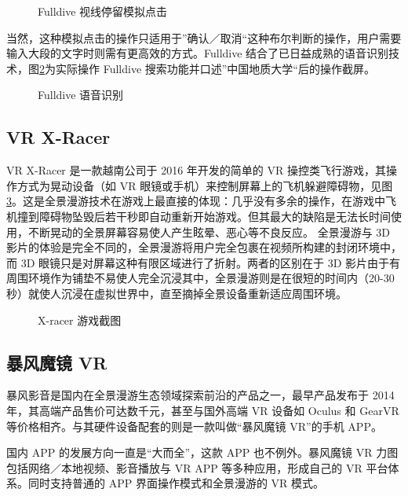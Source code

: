 \begin{figure}[htp]
\centering
{}
\caption{Fulldive 视线停留模拟点击}
\label{fig:fulldive3}
\end{figure}

当然，这种模拟点击的操作只适用于”确认／取消“这种布尔判断的操作，用户需要输入大段的文字时则需有更高效的方式。Fulldive 结合了已日益成熟的语音识别技术，图\ref{fig:fulldive4}为实际操作 Fulldive 搜索功能并口述”中国地质大学“后的操作截屏。

\begin{figure}[htp]
\centering
{}
\caption{Fulldive 语音识别}
\label{fig:fulldive4}
\end{figure}

\subsection{VR X-Racer}

VR X-Racer 是一款越南公司于 2016 年开发的简单的 VR 操控类飞行游戏，其操作方式为晃动设备（如 VR 眼镜或手机）来控制屏幕上的飞机躲避障碍物，见图\ref{fig:x-racer}。这是全景漫游技术在游戏上最直接的体现：几乎没有多余的操作，在游戏中飞机撞到障碍物坠毁后若干秒即自动重新开始游戏。但其最大的缺陷是无法长时间使用，不断晃动的全景屏幕容易使人产生眩晕、恶心等不良反应。
全景漫游与 3D 影片的体验是完全不同的，全景漫游将用户完全包裹在视频所构建的封闭环境中，而 3D 眼镜只是对屏幕这种有限区域进行了折射。两者的区别在于 3D 影片由于有周围环境作为铺垫不易使人完全沉浸其中，全景漫游则是在很短的时间内（20-30 秒）就使人沉浸在虚拟世界中，直至摘掉全景设备重新适应周围环境。

\begin{figure}[htp]
\centering
{}
\caption{X-racer 游戏截图}
\label{fig:x-racer}
\end{figure}

\subsection{暴风魔镜 VR}

暴风影音是国内在全景漫游生态领域探索前沿的产品之一，最早产品发布于 2014 年，其高端产品售价可达数千元，甚至与国外高端 VR 设备如 Oculus 和 GearVR 等价格相齐。与其硬件设备配套的则是一款叫做“暴风魔镜 VR”的手机 APP。

国内 APP 的发展方向一直是“大而全”，这款 APP 也不例外。暴风魔镜 VR 力图包括网络／本地视频、影音播放与 VR APP 等多种应用，形成自己的 VR 平台体系。同时支持普通的 APP 界面操作模式和全景漫游的 VR 模式。

